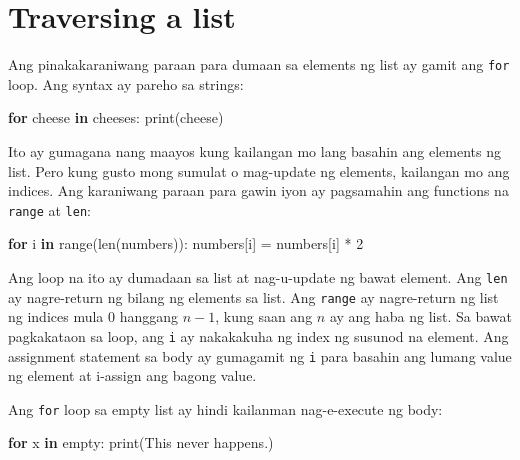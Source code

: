 \documentclass[10pt,]{book}
\newenvironment{Shaded}{}{}
\newcommand{\BuiltInTok}[1]{\textcolor[rgb]{0.00,0.50,0.00}{#1}}
\newcommand{\ControlFlowTok}[1]{\textcolor[rgb]{0.00,0.44,0.13}{\textbf{#1}}}
\newcommand{\DecValTok}[1]{\textcolor[rgb]{0.25,0.63,0.44}{#1}}
\newcommand{\KeywordTok}[1]{\textcolor[rgb]{0.00,0.44,0.13}{\textbf{#1}}}
\newcommand{\NormalTok}[1]{#1}
\newcommand{\OperatorTok}[1]{\textcolor[rgb]{0.40,0.40,0.40}{#1}}
\newcommand{\StringTok}[1]{\textcolor[rgb]{0.25,0.44,0.63}{#1}}
\begin{document}
\section{Traversing a list}\label{traversing-a-list}

  
 

Ang pinakakaraniwang paraan para dumaan sa elements ng list ay gamit ang
\texttt{for} loop. Ang syntax ay pareho sa strings:

\begin{Shaded}
\begin{Highlighting}[]
\ControlFlowTok{for}\NormalTok{ cheese }\KeywordTok{in}\NormalTok{ cheeses:}
    \BuiltInTok{print}\NormalTok{(cheese)}
\end{Highlighting}
\end{Shaded}

Ito ay gumagana nang maayos kung kailangan mo lang basahin ang elements
ng list. Pero kung gusto mong sumulat o mag-update ng elements,
kailangan mo ang indices. Ang karaniwang paraan para gawin iyon ay
pagsamahin ang functions na \texttt{range} at \texttt{len}:

 

\begin{Shaded}
\begin{Highlighting}[]
\ControlFlowTok{for}\NormalTok{ i }\KeywordTok{in} \BuiltInTok{range}\NormalTok{(}\BuiltInTok{len}\NormalTok{(numbers)):}
\NormalTok{    numbers[i] }\OperatorTok{=}\NormalTok{ numbers[i] }\OperatorTok{*} \DecValTok{2}
\end{Highlighting}
\end{Shaded}

Ang loop na ito ay dumadaan sa list at nag-u-update ng bawat element.
Ang \texttt{len} ay nagre-return ng bilang ng elements sa list. Ang
\texttt{range} ay nagre-return ng list ng indices mula 0 hanggang
\(n-1\), kung saan ang \(n\) ay ang haba ng list. Sa bawat pagkakataon
sa loop, ang \texttt{i} ay nakakakuha ng index ng susunod na element.
Ang assignment statement sa body ay gumagamit ng \texttt{i} para basahin
ang lumang value ng element at i-assign ang bagong value.

 

Ang \texttt{for} loop sa empty list ay hindi kailanman nag-e-execute ng
body:

\begin{Shaded}
\begin{Highlighting}[]
\ControlFlowTok{for}\NormalTok{ x }\KeywordTok{in}\NormalTok{ empty:}
    \BuiltInTok{print}\NormalTok{(}\StringTok{\textquotesingle{}This never happens.\textquotesingle{}}\NormalTok{)}
\end{Highlighting}
\end{Shaded}
\end{document}
